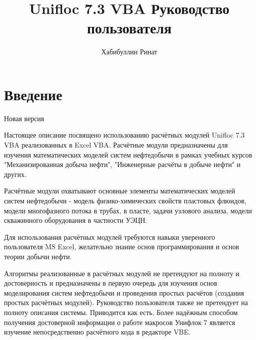 \documentclass[]{scrreprt}
\begin{document}
\newcommand{\unf}{Unifloc 7.3 VBA }

\newcommand{\putlisting}[1]{
	\tcbinputlisting{
		listing file=#1,
		minted language=vb.net,
		minted options={breaklines,fontsize=\small},%
		breakable,enhanced,%
		listing only
		}
}



\title{\unf Руководство пользователя}
\author{Хабибуллин Ринат}

\maketitle

\tableofcontents

\chapter{Введение}
Новая версия

Настоящее описание посвящено использованию расчётных модулей \unf реализованных в Excel VBA. Расчётные модули предназначены для изучения математических моделей систем нефтедобычи в рамках учебных курсов "Механизированная добыча нефти", "Инженерные расчёты в добыче нефти" и других.

Расчётные модули охватывают основные элементы математических моделей систем нефтедобычи - модель физико-химических свойств пластовых флюидов, модели многофазного потока в трубах, в пласте, задачи узлового анализа, модели скважинного оборудования в частности УЭЦН.  

Для использования расчётных модулей требуются навыки уверенного пользователя MS Excel, желательно знание основ программирования и основ теории добычи нефти. 

Алгоритмы реализованные в расчётных модулей не претендуют на полноту и достоверность и предназначены в первую очередь для изучения основ моделирования систем нефтедобычи и проведения простых расчётов (создания простых расчётных модулей). Руководство пользователя также не претендует на полноту описания системы. Приводится как есть. Более надёжным способом получения достоверной информации о работе макросов Унифлок 7 является изучение непосредственно расчётного кода в редакторе VBE.
\end{document}
